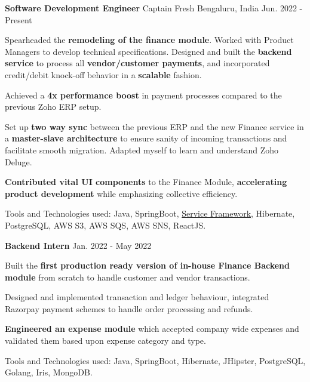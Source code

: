 

\begin{cventries}


\cventry
{\textbf{Software Development Engineer}} %
{Captain Fresh} %
{Bengaluru, India} %
{Jun. 2022 - Present} %
{
  \begin{cvitems} %
    \item {Spearheaded the \textbf{remodeling of the finance module}. Worked with Product Managers to develop technical specifications. Designed and built the \textbf{backend service} to process all \textbf{vendor/customer payments}, and incorporated credit/debit knock-off behavior in a \textbf{scalable} fashion.}
    \item {Achieved a \textbf{4x performance boost} in payment processes compared to the previous Zoho ERP setup. }
    \item {Set up \textbf{two way sync} between the previous ERP and the new Finance service in a \textbf{master-slave architecture} to ensure sanity of incoming transactions and facilitate smooth migration. Adapted myself to learn and understand Zoho Deluge.}
    \item {\textbf{Contributed vital UI components} to the Finance Module, \textbf{accelerating product development} while emphasizing collective efficiency.}
    \item {Tools and Technologies used: Java, SpringBoot, \href{https://github.com/ironman19933/service-framework}{Service Framework}, Hibernate, PostgreSQL, AWS S3, AWS SQS, AWS SNS, ReactJS.}
  \end{cvitems} 
}

\cventry
{\textbf{Backend Intern}} %
{} %
{} %
{Jan. 2022 - May 2022} %
{
  \begin{cvitems} %
    \item {Built the \textbf{first production ready version of in-house Finance Backend module} from scratch to handle customer and vendor transactions.}
    \item {Designed and implemented transaction and ledger behaviour, integrated Razorpay payment schemes to handle order processing and refunds.}
    \item {\textbf{Engineered an expense module} which accepted company wide expenses and validated them based upon expense category and type.}
    \item {Tools and Technologies used: Java, SpringBoot, Hibernate, JHipster, PostgreSQL, Golang, Iris, MongoDB.}
  \end{cvitems} 
}


\end{cventries}
